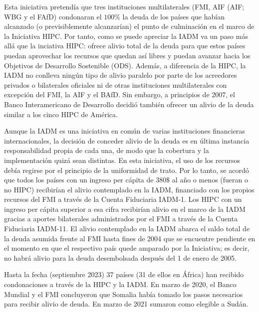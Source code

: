 \documentclass[10pt,a4paper]{article}
\begin{document}
Esta iniciativa pretendía que tres instituciones multilaterales (FMI, AIF (AIF; WBG y el FAfD) condonaran el $100\%$ la deuda de los países que habían alcanzado (o previsiblemente alcanzarían) el punto de culminación en el marco de la Iniciativa HIPC. Por tanto, como se puede apreciar la IADM va un paso más allá que la inciativa HIPC: ofrece alivio total de la deuda para que estos países puedan aprovechar los recursos que quedan así libres y puedan avanzar hacia los Objetivos de Desarrollo Sostenible (ODS). Además, a diferencia de la HIPC, la IADM no conlleva ningún tipo de alivio paralelo por parte de los acreedores privados o bilaterales oficiales ni de otras instituciones multilaterales con excepción del FMI, la AIF y el BAfD. Sin embargo, a principios de 2007, el Banco Interamericano de Desarrollo decidió también ofrecer un alivio de la deuda similar a los cinco HIPC de América.

Aunque la IADM es una iniciativa en común de varias instituciones financieras internacionales, la decisión de conceder alivio de la deuda es en última instancia responsabilidad propia de cada una, de modo que la cobertura y la implementación quizá sean distintas. En esta iniciativa, el uso de los recursos debía regirse por el principio de la uniformidad de trato. Por lo tanto, se acordó que todos los países con un ingreso per cápita de $380\$$ al año o menos (fueran o no HIPC) recibirían el alivio contemplado en la IADM, financiado con los propios recursos del FMI a través de la Cuenta Fiduciaria IADM-1. Los HIPC con un ingreso per cápita superior a esa cifra recibirían alivio en el marco de la IADM gracias a aportes bilaterales administrados por el FMI a través de la Cuenta Fiduciaria IADM-11. El alivio contemplado en la IADM abarca el saldo total de la deuda asumida frente al FMI hasta fines de 2004 que se encuentre pendiente en el momento en que el respectivo país quede amparado por la Iniciativa; es decir, no habrá alivio para la deuda desembolsada después del 1 de enero de 2005.

Hasta la fecha (septiembre 2023) 37 países (31 de ellos en África) han recibido condonaciones a través de la HIPC y la IADM. En marzo de 2020, el Banco Mundial y el FMI concluyeron que Somalia había tomado los pasos necesarios para recibir alivio de deuda. En marzo de 2021 sumaron como elegible a Sudán.
\end{document}
